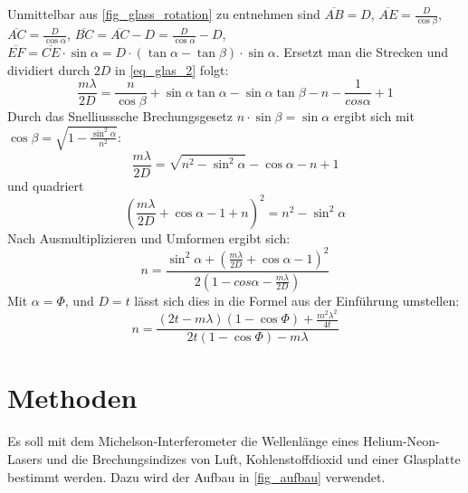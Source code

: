 \documentclass[
	a4paper,
	12pt,
	pagesize,
	ngerman
]{scrartcl}
\begin{document}
	Unmittelbar aus \cref{fig_glass_rotation} zu entnehmen sind
		$\overline{AB} = D$,
		$\overline{AE} = \frac{D}{\cos{\beta}}$,
		$\overline{AC} = \frac{D}{\cos{\alpha}}$,
		$\overline{BC} = \overline{AC} -D = \frac{D}{\cos{\alpha}}-D$,
		$\overline{EF} = \overline{CE} \cdot \sin{\alpha} = D\cdot (\tan{\alpha}-\tan{\beta})\cdot \sin{\alpha}$.
	Ersetzt man die Strecken und dividiert durch $2D$ in \cref{eq_glas_2} folgt:
	\begin{equation}
		\frac{m\lambda}{2D} = \frac{n}{\cos{\beta}} + \sin{\alpha}\tan{\alpha} - \sin{\alpha}\tan{\beta}-n  - \frac{1}{cos{\alpha}} +1
	\end{equation}
	Durch das Snelliusssche Brechungsgesetz $n \cdot \sin{\beta} = \sin{\alpha}$  ergibt sich mit $\cos{\beta}=\sqrt{1-\frac{\sin^2{\alpha}}{n^2}}$:
	\begin{equation}
		\frac{m\lambda}{2D} = \sqrt{n^2-\sin^2{\alpha}} -\cos{\alpha} - n + 1
	\end{equation}
	und quadriert
	\begin{equation}
		\left(\frac{m\lambda}{2D}+ \cos{\alpha}-1+n\right)^2 = n^2-\sin^2{\alpha}
	\end{equation}
	Nach Ausmultiplizieren und Umformen ergibt sich:
	\begin{equation}
		n=\frac{\sin^2{\alpha}+\left(\frac{m\lambda}{2D} + \cos{\alpha}-1\right)^2}{2(1-cos{\alpha}-\frac{m\lambda}{2D})}
	\end{equation}
	Mit $\alpha=\Phi$, und $D=t$ lässt sich dies in die Formel aus der Einführung umstellen:
	\begin{equation}
		n= \frac{(2t-m\lambda)(1-\cos{\Phi})+ \frac{m^2\lambda^2}{4t}}{2t(1-\cos{\Phi})-m\lambda}
		\label{eq_brechindex}
	\end{equation}

	\section{Methoden}
	Es soll mit dem Michelson-Interferometer die Wellenlänge eines Helium-Neon-Lasers und die Brechungsindizes von Luft, Kohlenstoffdioxid und einer Glasplatte bestimmt werden.
	Dazu wird der Aufbau in \cref{fig_aufbau} verwendet.
\end{document}
